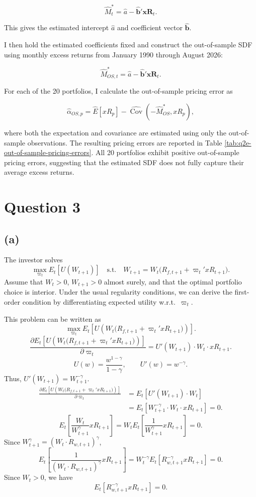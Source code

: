 \documentclass[11pt]{article}
\begin{document}
\[
\hat M_t^*=\hat a-\hat{\mathbf b}'\mathbf{xR}_t.
\]

This gives the estimated intercept \(\hat a\) and coefficient vector \(\hat{\mathbf b}\).

I then hold the estimated coefficients fixed and construct the out-of-sample SDF using monthly excess returns from January 1990 through August 2026:

\[
\hat M_{OS,t}^*=\hat a-\hat{\mathbf b}'\mathbf{xR}_t.
\]

For each of the 20 portfolios, I calculate the out-of-sample pricing error as

\[
\hat\alpha_{OS,p}
=\widehat E[xR_p]
-\widehat{\operatorname{Cov}}(-\hat M_{OS}^*,xR_p),
\]

where both the expectation and covariance are estimated using only the out-of-sample observations. The resulting pricing errors are reported in Table \ref{tab:q2e-out-of-sample-pricing-errors}. All 20 portfolios exhibit positive out-of-sample pricing errors, suggesting that the estimated SDF does not fully capture their average excess returns.

\FloatBarrier

\clearpage
\section*{Question 3}
\subsection*{(a)}

The investor solves
\[
\max_{\varpi_t} E_t[U(W_{t+1})]
\quad \text{s.t.}\quad
W_{t+1}=W_t\bigl(R_{f,t+1}+\varpi_t'xR_{t+1}\bigr).
\]
Assume that $W_t>0$, $W_{t+1}>0$ almost surely, and that the optimal
portfolio choice is interior. Under the usual regularity conditions, we
can derive the first-order condition by differentiating expected utility
w.r.t.\ $\varpi_t$.

This problem can be written as
\[
\max_{\varpi_t}
E_t\!\left[U\!\left(W_t\bigl(R_{f,t+1}+\varpi_t'xR_{t+1}\bigr)\right)\right].
\]
\[
\frac{\partial E_t\!\left[U\!\left(W_t\bigl(R_{f,t+1}+\varpi_t'xR_{t+1}\bigr)\right)\right]}
     {\partial\varpi_t}
=U'(W_{t+1})\cdot W_t\cdot xR_{t+1}.
\]
\[
U(w)=\frac{w^{1-\gamma}}{1-\gamma},
\qquad U'(w)=w^{-\gamma}.
\]
Thus, $U'(W_{t+1})=W_{t+1}^{-\gamma}$.
\begin{align*}
\frac{\partial E_t\!\left[U\!\left(W_t\bigl(R_{f,t+1}+\varpi_t'xR_{t+1}\bigr)\right)\right]}
     {\partial\varpi_t}
&=E_t\!\left[U'(W_{t+1})\cdot W_t\right] \\
&=E_t\!\left[W_{t+1}^{-\gamma}\cdot W_t\cdot xR_{t+1}\right]=0.
\end{align*}
\[
E_t\!\left[\frac{W_t}{W_{t+1}^{\gamma}}xR_{t+1}\right]
=W_t E_t\!\left[\frac{1}{W_{t+1}^{\gamma}}xR_{t+1}\right]=0.
\]
Since $W_{t+1}^{\gamma}=(W_t\cdot R_{w,t+1})^{\gamma}$,
\[
E_t\!\left[\frac{1}{(W_t\cdot R_{w,t+1})^{\gamma}}xR_{t+1}\right]
=W_t^{-\gamma}E_t\!\left[R_{w,t+1}^{-\gamma}xR_{t+1}\right]=0.
\]
Since $W_t>0$, we have
\[
E_t\!\left[R_{w,t+1}^{-\gamma}xR_{t+1}\right]=0.
\]
\end{document}
